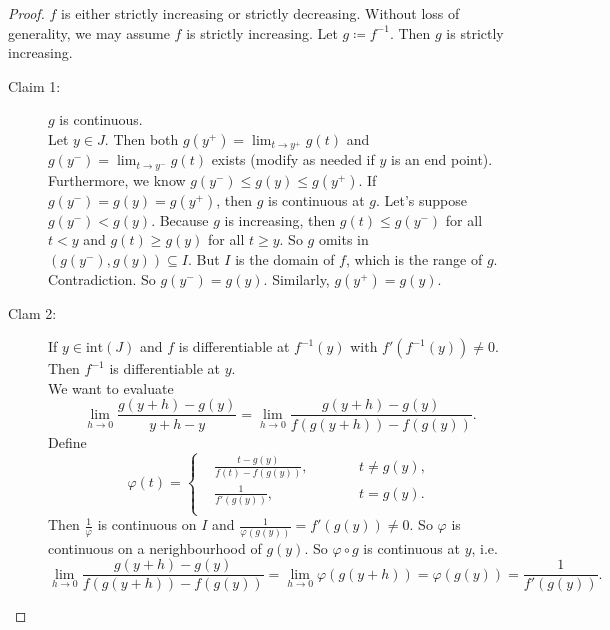 \documentclass[12pt]{article}
\theoremstyle{plain}
\theoremstyle{definition}
\begin{document}
\begin{proof}
    $f$ is either strictly increasing or strictly decreasing.
    Without loss of generality, we may assume $f$ is strictly increasing.
    Let $g\coloneqq f^{-1}$.
    Then $g$ is strictly increasing.
    \begin{description}
        \item[Claim 1:] $g$ is continuous.\\
            Let $y\in J$.
            Then both $g(y^+) = \lim_{t\rightarrow y^+}g(t)$ and $g(y^-) = \lim_{t\rightarrow y^-}g(t)$ exists (modify as
            needed if $y$ is an end point).
            Furthermore, we know $g(y^-) \leq g(y) \leq g(y^+)$.
            If $g(y^-) = g(y) = g(y^+)$, then $g$ is continuous at $g$.
            Let's suppose $g(y^-) < g(y)$.
            Because $g$ is increasing, then $g(t)\leq g(y^-)$ for all $t<y$ and $g(t)\geq g(y)$ for all $t\geq y$.
            So $g$ omits in $(g(y^-),g(y))\subseteq I$.
            But $I$ is the domain of $f$, which is the range of $g$.
            Contradiction.
            So $g(y^-)=g(y)$. Similarly, $g(y^+) = g(y)$.
        \item[Clam 2:] If $y\in \text{int}(J)$ and $f$ is differentiable at $f^{-1}(y)$ with $f'(f^{-1}(y))\neq0$.
            Then $f^{-1}$ is differentiable at $y$.\\
            We want to evaluate
            \[\lim_{h\rightarrow 0}\frac{g(y+h)-g(y)}{y+h-y} = \lim_{h\rightarrow0}\frac{g(y+h)-g(y)}{f(g(y+h)) -
            f(g(y))}.\]
            Define 
            \[\varphi(t)=\left\{
                    \begin{aligned}
                        &\frac{t-g(y)}{f(t)-f(g(y))},\qquad&& t\neq g(y),\\
                        &\frac{1}{f'(g(y))},&& t=g(y).\\
                    \end{aligned}
            \right.\]
            Then $\frac{1}{\varphi}$ is continuous on $I$ and $\frac{1}{\varphi(g(y))} = f'(g(y))\neq 0.$ 
            So $\varphi$ is continuous on a nerighbourhood of $g(y)$.
            So $\varphi\circ g$ is continuous at $y$, i.e.
            \[\lim_{h\rightarrow0}\frac{g(y+h)-g(y)}{f(g(y+h)) - f(g(y))} = \lim_{h\rightarrow 0}\varphi(g(y+h)) = \varphi(g(y)) = \frac{1}{f'(g(y))}.\]
    \end{description}
\end{proof}
\end{document}
